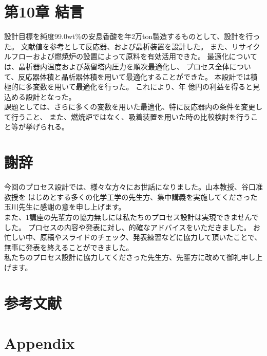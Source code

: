 \documentclass[a4j]{jsarticle}
\begin{document}
\newpage
\section*{第10章 結言}
設計目標を純度99.0wt\%の安息香酸を年2万ton製造するものとして、設計を行った。
文献値を参考として反応器、および晶析装置を設計した。
また、リサイクルフローおよび燃焼炉の設置によって原料を有効活用できた。
最適化については、晶析器内温度および蒸留塔内圧力を順次最適化し、
プロセス全体について、反応器体積と晶析器体積を用いて最適化することができた。
本設計では積極的に多変数を用いて最適化を行った。
これにより、年 億円の利益を得ると見込める設計となった。\\
課題としては、さらに多くの変数を用いた最適化、特に反応器内の条件を変更して行うこと、
また、燃焼炉ではなく、吸着装置を用いた時の比較検討を行うこと等が挙げられる。

\newpage
\section*{謝辞}
今回のプロセス設計では、様々な方々にお世話になりました。山本教授、谷口准教授を
はじめとする多くの化学工学の先生方、集中講義を実施してくださった玉川先生に感謝の意を申し上げます。\\
また、1講座の先輩方の協力無しには私たちのプロセス設計は実現できませんでした。
プロセスの内容や発表に対し、的確なアドバイスをいただきました。
お忙しい中、原稿やスライドのチェック、発表練習などに協力して頂いたことで、無事に発表を終えることができました。\\
私たちのプロセス設計に協力してくださった先生方、先輩方に改めて御礼申し上げます。

\newpage
\section*{参考文献}

\newpage
\section*{Appendix}
\end{document}
